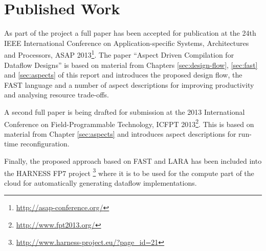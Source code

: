 \section{Published Work}

As part of the project a full paper has been accepted for publication
at the 24th IEEE International Conference on Application-specific
Systems, Architectures and Processors, ASAP
2013\footnote{\url{http://asap-conference.org/}}.  The paper ``Aspect
Driven Compilation for Dataflow Designs'' \cite{pgrig} is based on
material from Chapters \ref{sec:design-flow}, \ref{sec:fast} and
\ref{sec:aspects} of this report and introduces the proposed design
flow, the FAST language and a number of aspect descriptions for
improving productivity and analysing resource trade-offs.

A second full paper is being drafted for submission at the 2013
International Conference on Field-Programmable Technology, ICFPT
2013\footnote{\url{http://www.fpt2013.org/}}. This is based on material
from Chapter \ref{sec:aspects} and introduces aspect descriptions for
run-time reconfiguration.

Finally, the proposed approach based on FAST and LARA has been
included into the HARNESS FP7
project \footnote{\url{http://www.harness-project.eu/?page_id=21}} where it is to be
used for the compute part of the cloud for automatically generating
dataflow implementations.
